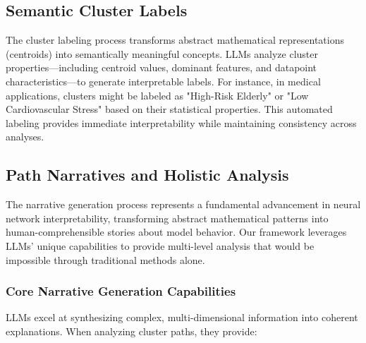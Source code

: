 \subsection{Semantic Cluster Labels}

The cluster labeling process transforms abstract mathematical representations (centroids) into semantically meaningful concepts. LLMs analyze cluster properties—including centroid values, dominant features, and datapoint characteristics—to generate interpretable labels. For instance, in medical applications, clusters might be labeled as "High-Risk Elderly" or "Low Cardiovascular Stress" based on their statistical properties. This automated labeling provides immediate interpretability while maintaining consistency across analyses.

\subsection{Path Narratives and Holistic Analysis}

The narrative generation process represents a fundamental advancement in neural network interpretability, transforming abstract mathematical patterns into human-comprehensible stories about model behavior. Our framework leverages LLMs' unique capabilities to provide multi-level analysis that would be impossible through traditional methods alone.

\subsubsection{Core Narrative Generation Capabilities}

LLMs excel at synthesizing complex, multi-dimensional information into coherent explanations. When analyzing cluster paths, they provide:

